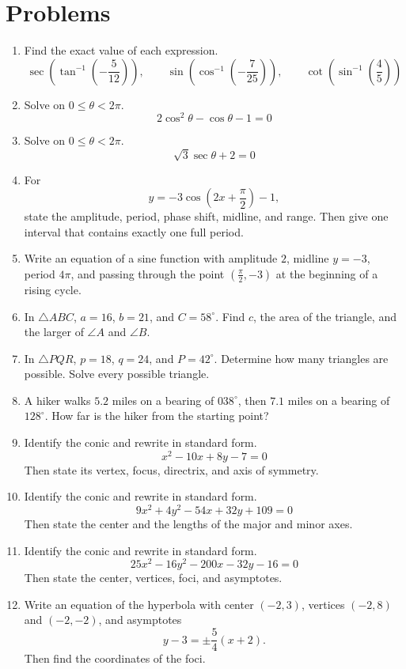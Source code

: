 \documentclass[12pt]{article}
\begin{document}
\section*{Problems}
\begin{enumerate}[leftmargin=*, itemsep=1.15em, topsep=0.8em]
  \item Find the exact value of each expression.
  \[
  \sec\!\left(\tan^{-1}\!\left(-\frac{5}{12}\right)\right),\qquad
  \sin\!\left(\cos^{-1}\!\left(-\frac{7}{25}\right)\right),\qquad
  \cot\!\left(\sin^{-1}\!\left(\frac{4}{5}\right)\right)
  \]

  \item Solve on $0\le \theta<2\pi$.
  \[
  2\cos^2\theta-\cos\theta-1=0
  \]

  \item Solve on $0\le \theta<2\pi$.
  \[
  \sqrt{3}\sec\theta+2=0
  \]

  \item For
  \[
  y=-3\cos\left(2x+\frac{\pi}{2}\right)-1,
  \]
  state the amplitude, period, phase shift, midline, and range. Then give one interval that contains exactly one full period.

  \item Write an equation of a sine function with amplitude $2$, midline $y=-3$, period $4\pi$, and passing through the point $\left(\frac{\pi}{2},-3\right)$ at the beginning of a rising cycle.

  \item In $\triangle ABC$, $a=16$, $b=21$, and $C=58^\circ$. Find $c$, the area of the triangle, and the larger of $\angle A$ and $\angle B$.

  \item In $\triangle PQR$, $p=18$, $q=24$, and $P=42^\circ$. Determine how many triangles are possible. Solve every possible triangle.

  \item A hiker walks $5.2$ miles on a bearing of $038^\circ$, then $7.1$ miles on a bearing of $128^\circ$. How far is the hiker from the starting point?

  \item Identify the conic and rewrite in standard form.
  \[
  x^2-10x+8y-7=0
  \]
  Then state its vertex, focus, directrix, and axis of symmetry.

  \item Identify the conic and rewrite in standard form.
  \[
  9x^2+4y^2-54x+32y+109=0
  \]
  Then state the center and the lengths of the major and minor axes.

  \item Identify the conic and rewrite in standard form.
  \[
  25x^2-16y^2-200x-32y-16=0
  \]
  Then state the center, vertices, foci, and asymptotes.

  \item Write an equation of the hyperbola with center $(-2,3)$, vertices $(-2,8)$ and $(-2,-2)$, and asymptotes
  \[
  y-3=\pm \frac{5}{4}(x+2).
  \]
  Then find the coordinates of the foci.
\end{enumerate}
\end{document}
